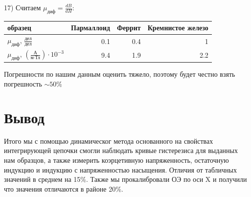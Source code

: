 \documentclass[a4paper,12pt]{extarticle}
\begin{document}
17) Считаем $\mu_{\text{диф}} = \frac{dB}{dH}$:
\begin{center}
    \begin{tabular}{|l|r|r|r|}
        \hline
        образец & \multicolumn{1}{l|}{Пармаллоид} & \multicolumn{1}{l|}{Феррит} & \multicolumn{1}{l|}{Кремнистое железо} \\ \hline
        $\mu_{\text{диф}}$, $\frac{\text{дел}}{\text{дел}}$ & 0.1 & 0.4 & 1 \\ \hline
        $\mu_{\text{диф}}$,  $\left( \frac{\text{А}}{\text{м}\cdot\text{Тл}} \right)\cdot 10^{-3}$     & 9.4                            & 1.9                        & 2.2                                   \\ \hline
    \end{tabular}
\end{center}
Погрешности по нашим данным оценить тяжело, поэтому будет честно взять погрешность $\sim 50 \%$

\section*{Вывод}
Итого мы с помощью динамическог метода основанного на свойствах интегрирующей цепочки смогли наблюдать кривые гистерезиса для выданных нам образцов, а также измерить коэрцетивную напряженность, остаточную индукцию и индукцию с напряженностью насыщения. Отличия от табличных значений в среднем на 15\%.
Также мы прокалибровали ОЭ по оси X и получили что значения отличаются в районе 20\%.
\end{document}

